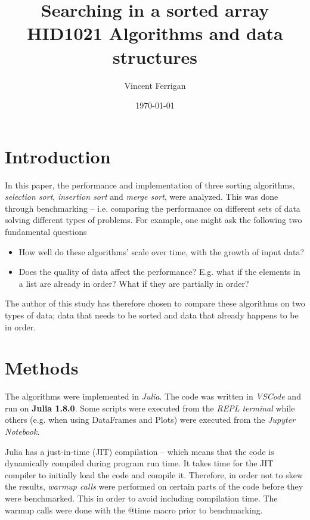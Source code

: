 \documentclass[a4paper, 11pt]{article}
\title{Searching in a sorted array\\ \small{HID1021 Algorithms and data structures}} %
\author{Vincent Ferrigan}
\date{\today}
\begin{document}
    \maketitle
    \section*{Introduction}
    In this paper, the performance and implementation of three sorting algorithms,  
    \emph{selection sort}, \emph{insertion sort} and \emph{merge sort}, 
    were analyzed. This was done through benchmarking -- i.e. comparing the performance on
    different sets of data solving different types of problems. 
    For example, one might ask the following two fundamental questions
    
    \begin{itemize}
        \item How well do these algorithms' scale over time, with the growth of input data?
        \item Does the quality of data affect the performance?
        E.g. what if the elements in a list are already in order? 
        What if they are partially in order?
    \end{itemize}

    The author of this study has therefore chosen to compare these algorithms on 
    two types of data; data that needs to be sorted and data that already
    happens to be in order. 
    

    \section*{Methods}
    The algorithms were implemented in \emph{Julia}. The code was written in 
    \emph{VSCode} and run on \textbf{Julia 1.8.0}. Some scripts were executed
    from the \emph{REPL terminal} while others (e.g. when using DataFrames and
    Plots) were executed from the \emph{Jupyter Notebook}. 

    Julia has a just-in-time (JIT) compilation -- which means that the code is
    dynamically compiled during program run time.     
    It takes time for the JIT compiler to 
    initially load the code and compile it. Therefore, in order not to skew the
    results, \emph{warmup calls} were performed on certain parts of the code
    before they were benchmarked. This in order to avoid including 
    compilation time. The warmup calls were done with the @time macro prior to
    benchmarking.
    

\clearpage
\end{document}
